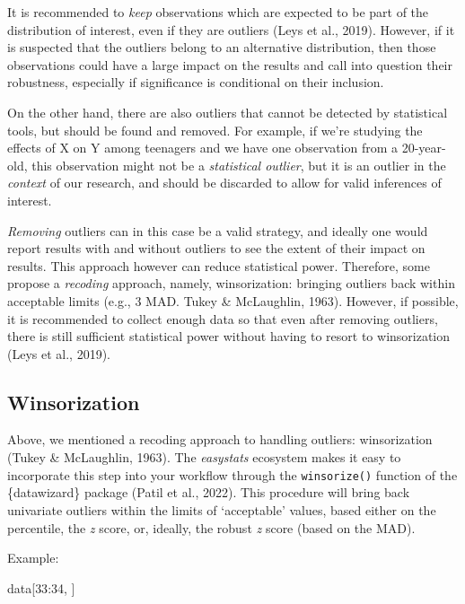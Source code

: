 \documentclass[
]{article}
\newenvironment{Shaded}{\begin{snugshade}}{\end{snugshade}}
\newcommand{\DecValTok}[1]{\textcolor[rgb]{0.00,0.00,0.81}{#1}}
\newcommand{\NormalTok}[1]{#1}
\newcommand{\SpecialCharTok}[1]{\textcolor[rgb]{0.00,0.00,0.00}{#1}}
\begin{document}
It is recommended to \emph{keep} observations which are expected to be part of the distribution of interest, even if they are outliers (Leys et al., 2019). However, if it is suspected that the outliers belong to an alternative distribution, then those observations could have a large impact on the results and call into question their robustness, especially if significance is conditional on their inclusion.

On the other hand, there are also outliers that cannot be detected by statistical tools, but should be found and removed. For example, if we're studying the effects of X on Y among teenagers and we have one observation from a 20-year-old, this observation might not be a \emph{statistical outlier}, but it is an outlier in the \emph{context} of our research, and should be discarded to allow for valid inferences of interest.

\emph{Removing} outliers can in this case be a valid strategy, and ideally one would report results with and without outliers to see the extent of their impact on results. This approach however can reduce statistical power. Therefore, some propose a \emph{recoding} approach, namely, winsorization: bringing outliers back within acceptable limits (e.g., 3 MAD. Tukey \& McLaughlin, 1963). However, if possible, it is recommended to collect enough data so that even after removing outliers, there is still sufficient statistical power without having to resort to winsorization (Leys et al., 2019).

\hypertarget{winsorization}{%
\subsection{Winsorization}\label{winsorization}}

Above, we mentioned a recoding approach to handling outliers: winsorization (Tukey \& McLaughlin, 1963). The \emph{easystats} ecosystem makes it easy to incorporate this step into your workflow through the \texttt{winsorize()} function of the \{datawizard\} package (Patil et al., 2022). This procedure will bring back univariate outliers within the limits of `acceptable' values, based either on the percentile, the \emph{z} score, or, ideally, the robust \emph{z} score (based on the MAD).

Example:

\begin{Shaded}
\begin{Highlighting}[]
\NormalTok{data[}\DecValTok{33}\SpecialCharTok{:}\DecValTok{34}\NormalTok{, ]}
\end{Highlighting}
\end{Shaded}
\end{document}
